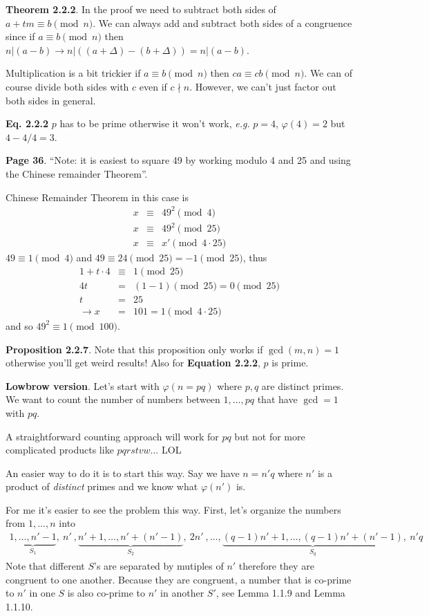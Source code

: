 \documentclass[aps,preprint,preprintnumbers,nofootinbib,showpacs,prd]{revtex4-1}
\newcommand{\eg}{{\it e.g.} }
\newcommand{\nbea}{\begin{eqnarray*}}
\newcommand{\neea}{\end{eqnarray*}}
\begin{document}
{\bf Theorem 2.2.2}. In the proof we need to subtract both sides of $a + tm \equiv b \pmod{n}$. We can always add and subtract both sides of a congruence since if $a \equiv b \pmod{n}$ then $n|(a-b) \to n|((a+\Delta) - (b + \Delta)) = n|(a-b)$.

Multiplication is a bit trickier if $a \equiv b \pmod{n}$ then $ca \equiv cb \pmod{n}$. We can of course divide both sides with $c$ even if $c \nmid n$. However, we can't just factor out both sides in general.

{\bf Eq. 2.2.2} $p$ has to be prime otherwise it won't work, \eg $p=4$, $\varphi(4) = 2$ but $4 - 4/4 = 3$.

{\bf Page 36}. ``Note: it is easiest to square 49 by working modulo 4 and 25 and using the Chinese remainder Theorem''.

Chinese Remainder Theorem in this case is
%
\nbea
x & \equiv & 49^2 \pmod{4} \\
x & \equiv & 49^2 \pmod{25} \\
x & \equiv & x' \pmod{4\cdot 25}
\neea
%
$49 \equiv 1 \pmod{4}$ and $49 \equiv 24 \pmod{25} = -1 \pmod{25}$, thus
%
\nbea
1 + t\cdot 4 & \equiv & 1 \pmod{25} \\
4t & = & (1-1) \pmod{25}  = 0 \pmod{25} \\
t & = & 25 \\
\to x & = & 101  = 1 \pmod{4 \cdot 25}
\neea
%
and so $49^2 \equiv 1 \pmod{100}$.

{\bf Proposition 2.2.7}. Note that this proposition only works if $\gcd(m,n) = 1$ otherwise you'll get weird results! Also for {\bf Equation 2.2.2}, $p$ is prime.

{\bf Lowbrow version}. Let's start with $\varphi(n=pq)$ where $p,q$ are distinct primes. We want to count the number of numbers between $1, \dots, pq$ that have $\gcd=1$ with $pq$.

A straightforward counting approach will work for $pq$ but not for more complicated products like $pqrstvw \dots$ LOL

An easier way to do it is to start this way. Say we have $n = n' q$ where $n'$ is a product of {\it distinct} primes and we know what $\varphi(n')$ is.

For me it's easier to see the problem this way. First, let's organize the numbers from $1, \dots, n$ into
%
\nbea
\underbrace{1, \dots, n'-1}_\text{$S_1$}, ~n'~, \underbrace{n'+1, \dots, n'+(n'-1)}_\text{$S_2$}, ~2n'~, \dots, \underbrace{(q-1)n' + 1, \dots, (q-1)n' + (n' - 1)}_\text{$S_q$}, ~n'q
\neea
%
Note that different $S$'s are separated by mutiples of $n'$ therefore they are congruent to one another. Because they are congruent, a number that is co-prime to $n'$ in one $S$ is also co-prime to $n'$ in another $S'$, see Lemma 1.1.9 and Lemma 1.1.10.
\end{document}
